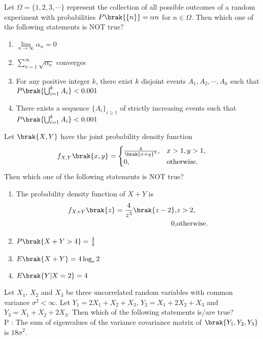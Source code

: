 \item Let $\Omega = \{1, 2, 3, \cdots \}$ represent the collection of all possible outcomes of a random experiment with probabilities $P\brak{\{n\}} = \alpha n$ for $n \in \Omega$. Then which one of the following statements is NOT true?
\begin{enumerate}
    \item $\lim\limits_{n\rightarrow\infty}\alpha_n = 0$
    \item $\sum_{n=1}^{\infty}\sqrt{\alpha_n}$ converges
    \item For any positive integer $k$, there exist $k$ disjoint events $A_1, A_2, \cdots , A_k$ such that $P\brak{\bigcup_{i=1}^{k}A_i} < 0.001$
    \item There exists a sequence $\{A_i\}_{i \geq 1}$ of strictly increasing events such that $P\brak{\bigcup_{i=1}^{k}A_i} < 0.001$ \\
\end{enumerate}
\item Let $\brak{X, Y}$ have the joint probability density function
\begin{align*}
    f_{X, Y}\brak{x, y} = \begin{cases}
        \frac{4}{\brak{x+y}^3}, & x > 1, y > 1, \\
        0, & \text{otherwise}.
    \end{cases}
\end{align*}
Then which one of the following statements is NOT true?
\begin{enumerate}
    \item The probability density function of $X + Y$ is
    \begin{align*}
        f_{X + Y}\brak{z} = \frac{4}{z^3}\brak{z - 2}, & z > 2, \\
        0, & \text{otherwise}.
    \end{align*}
    \item $P\brak{X + Y > 4} = \frac{3}{4}$
    \item $E\brak{X + Y} = 4\log_{e}2$
    \item $E\brak{Y | X = 2} = 4$ \\
\end{enumerate}
\item Let $X_1$, $X_2$ and $X_3$ be three uncorrelated random variables with common variance $\sigma^2 < \infty$. Let $Y_1 = 2X_1 + X_2 + X_3$, $Y_2 = X_1 + 2X_2 + X_3$ and $Y_3 = X_1 + X_2 + 2X_3$. Then which of the following statements is/are true? \\
P : The sum of eigenvalues of the variance covariance matrix of $\brak{Y_1, Y_2, Y_3}$ is $18\sigma^2$. \\
